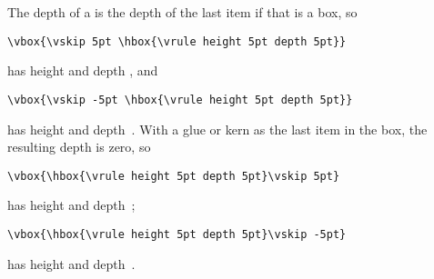 \documentclass{book}
\begin{document}
The depth of a  is the depth of the last item if
that is a box, so
\begin{verbatim}
\vbox{\vskip 5pt \hbox{\vrule height 5pt depth 5pt}}
\end{verbatim}
has height \n{10pt} and depth \n{5pt},
and
\begin{verbatim}
\vbox{\vskip -5pt \hbox{\vrule height 5pt depth 5pt}}
\end{verbatim}
has height \n{0pt} and depth~\n{5pt}.
With a glue or kern as the last item in the box, the resulting depth
is zero, so
\begin{verbatim}
\vbox{\hbox{\vrule height 5pt depth 5pt}\vskip 5pt}
\end{verbatim}
has height \n{15pt} and depth~\n{0pt};
\begin{verbatim}
\vbox{\hbox{\vrule height 5pt depth 5pt}\vskip -5pt}
\end{verbatim}
has height \n{5pt} and depth~\n{0pt}.
\end{document}
